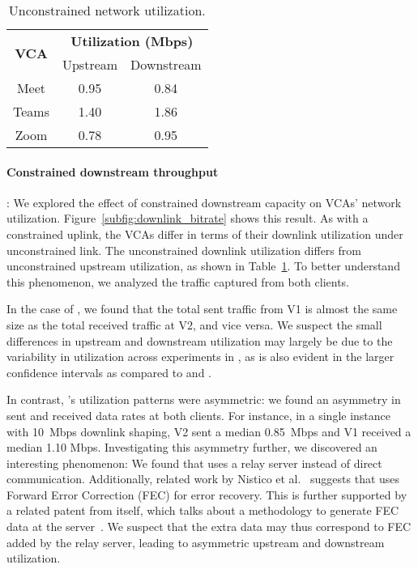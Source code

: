 \begin{table}[t]
\centering
\begin{tabular}{|c|c|c|}
\hline
\multirow{2}{*}{\textbf{VCA}} & 
    \multicolumn{2}{c|}{{\bf Utilization (Mbps)}} \\ 
    \cline{2-3} 
                              & Upstream                   & Downstream                  \\ \hline
Meet                          & 0.95                     & 0.84                      \\ 
Teams                         & 1.40                      & 1.86                      \\ 
Zoom                          & 0.78                     & 0.95                      \\ \hline
\end{tabular}
\caption{Unconstrained network utilization.}
\vspace{-1.5em}
\label{tab:vca_static}
\end{table}





\paragraph{Constrained downstream throughput}: We explored the effect of constrained
downstream capacity
on VCAs' network utilization. Figure~\ref{subfig:downlink_bitrate} shows this
result.
As with a constrained uplink, the VCAs differ in terms of their downlink
utilization under unconstrained link. The unconstrained downlink utilization
differs from unconstrained upstream utilization, as shown in
Table~\ref{tab:vca_static}. To better understand this phenomenon, we analyzed the traffic
captured from both clients. 

In the case of \teams, we found that the total sent traffic from V1
is almost the same size as the total received traffic at V2, and vice versa. 
We suspect the small
differences in upstream and downstream utilization may largely be due to the
variability in utilization across experiments in \teams, as is
also evident in the larger confidence intervals as compared to \zoom and \meet. 

In contrast, \zoom's utilization patterns were asymmetric: we found an
asymmetry in sent and received data rates at both clients. For instance, in a
single instance with 10~Mbps downlink shaping, V2 sent a median 0.85~Mbps and
V1 received a median 1.10 Mbps. Investigating this asymmetry further, we
discovered an interesting phenomenon: We found that \zoom uses a relay server
instead of direct communication. Additionally, related work by Nistico et
al.~\cite{nistico2020comparative} suggests that \zoom uses Forward Error
Correction (FEC) for error recovery. This is further supported by a related
patent from \zoom itself, which talks about a methodology to generate FEC data
at the server~\cite{liu2019error}. We suspect that the extra data may thus
correspond to FEC added by the relay server, leading to asymmetric upstream and
downstream utilization.  

